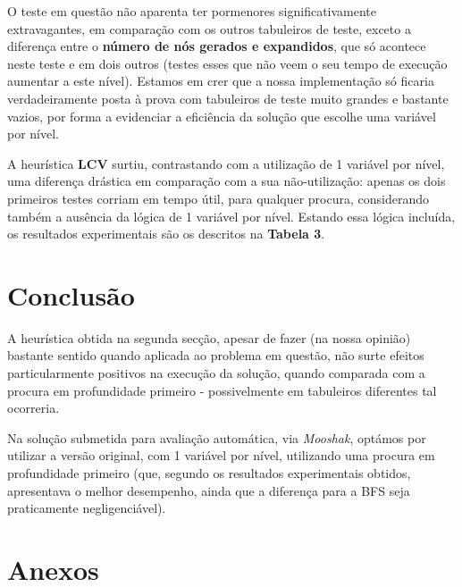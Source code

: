 \documentclass[12pt,a4paper]{article}
\begin{document}
O teste em questão não
aparenta ter pormenores significativamente extravagantes, em comparação com os
outros tabuleiros de teste, exceto a diferença entre o \textbf{número de nós gerados e expandidos},
que só acontece neste teste e em dois outros (testes esses que não
veem o seu tempo de execução aumentar a este nível).
Estamos em crer que a nossa implementação só ficaria verdadeiramente
posta à prova com tabuleiros de teste muito grandes e bastante vazios, por forma
a evidenciar a eficiência da solução que escolhe uma variável por nível.

A heurística \textbf{LCV} surtiu, contrastando com a utilização de 1 variável por nível,
uma diferença drástica em comparação com a sua não-utilização: apenas os
dois primeiros testes corriam em tempo útil, para qualquer procura, considerando
também a ausência da lógica de 1 variável por nível. Estando essa lógica
incluída, os resultados experimentais são os descritos na \textbf{Tabela 3}.

\section*{Conclusão}

A heurística obtida na segunda secção, apesar de fazer (na nossa opinião) bastante
sentido quando aplicada ao problema em questão, não surte efeitos particularmente
positivos na execução da solução, quando comparada com a procura em profundidade
primeiro - possivelmente em tabuleiros diferentes tal ocorreria.

Na solução submetida para avaliação automática, via \textit{Mooshak}, optámos
por utilizar a versão original, com 1 variável por nível, utilizando uma
procura em profundidade primeiro (que, segundo os resultados experimentais obtidos,
apresentava o melhor desempenho, ainda que a diferença para a BFS seja
praticamente negligenciável).


\section*{Anexos}

\end{document}

